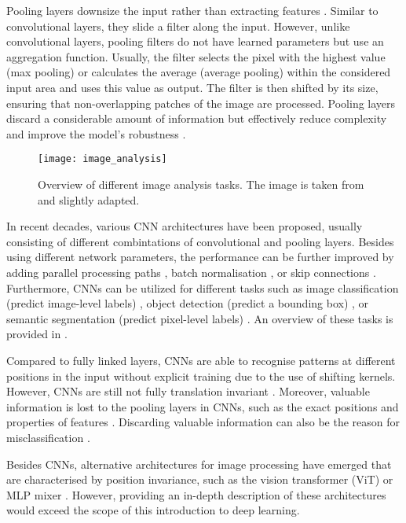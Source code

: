 Pooling layers downsize the input rather than extracting features \cite{ciresan_flexible_2011}.
Similar to convolutional layers, they slide a filter along the input.
However, unlike convolutional layers, pooling filters do not have learned parameters but use an aggregation function.
Usually, the filter selects the pixel with the highest value (max pooling) or calculates the average (average pooling) within the considered input area and uses this value as output.
The filter is then shifted by its size, ensuring that non-overlapping patches of the image are processed.
Pooling layers discard a considerable amount of information but effectively reduce complexity and improve the model's robustness \cite{ciresan_flexible_2011}.

\begin{figure}[h]
    \centering
    \texttt{[image: image\_analysis]}
    \caption[Overview of different image analysis tasks]{Overview of different image analysis tasks. The image is taken from  and slightly adapted.}
\end{figure}
In recent decades, various CNN architectures have been proposed, usually consisting of different combintations of convolutional and pooling layers. Besides using different network parameters, the performance can be further improved by adding parallel processing paths \cite{szegedy_going_2015}, batch normalisation \cite{ioffe_batch_2015}, or skip connections \cite{he_deep_2016}. Furthermore, CNNs can be utilized for different tasks such as image classification (predict image-level labels) \cite{schmarje_survey_2021}, object detection (predict a bounding box) \cite{zou_object_2023}, or semantic segmentation (predict pixel-level labels) \cite{asgari_taghanaki_deep_2021}. An overview of these tasks is provided in .

Compared to fully linked layers, CNNs are able to recognise patterns at different positions in the input without explicit training due to the use of shifting kernels. However, CNNs are still not fully translation invariant \cite{gerber_stride_2020}. Moreover, valuable information is lost to the pooling layers in CNNs, such as the exact positions and properties of features \cite{ciresan_flexible_2011}. Discarding valuable information can also be the reason for misclassification .

Besides CNNs, alternative architectures for image processing have emerged that are characterised by position invariance, such as the vision transformer (ViT)  or MLP mixer . However, providing an in-depth description of these architectures would exceed the scope of this introduction to deep learning.


